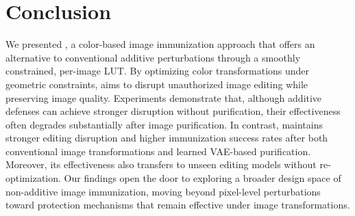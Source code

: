 \section{Conclusion}
\label{sec:conclusion}
We presented \capg{}, a color-based image immunization approach that offers an alternative to conventional additive perturbations through a smoothly constrained, per-image LUT. By optimizing color transformations under geometric constraints, \capg{} aims to disrupt unauthorized image editing while preserving image quality. Experiments demonstrate that, although additive defenses can achieve stronger disruption without purification, their effectiveness often degrades substantially after image purification. In contrast, \capg{} maintains stronger editing disruption and higher immunization success rates after both conventional image transformations and learned VAE-based purification. Moreover, its effectiveness also transfers to unseen editing models without re-optimization. Our findings open the door to exploring a broader design space of non-additive image immunization, moving beyond pixel-level perturbations toward protection mechanisms that remain effective under image transformations.

